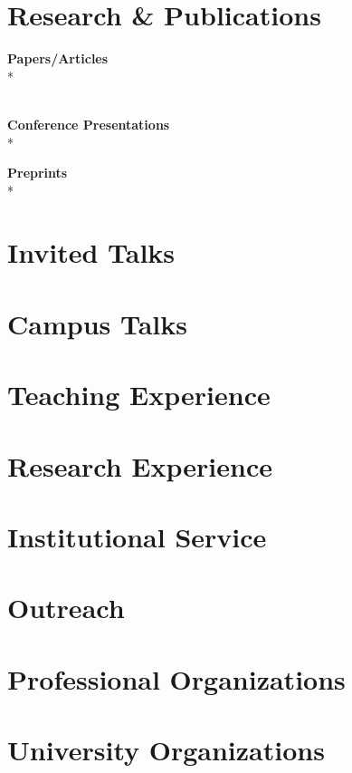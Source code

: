 \documentclass[margin,line]{res}
\begin{document}
\begin{resume}
\section{\sc Research \& Publications}

\textbf{Papers/Articles}\vspace{2mm}\\*

~\\
\textbf{Conference Presentations}\vspace{2mm}\\*

\textbf{Preprints}\vspace{2mm}\\*

\section{\sc Invited Talks}

\section{\sc Campus Talks}

\newpage
\section{\sc Teaching Experience}

\section{\sc Research Experience}

\section{\sc Institutional Service}

\section{\sc Outreach}

\section{\sc Professional Organizations}

\section{\sc University Organizations}

\end{resume}
\end{document}
